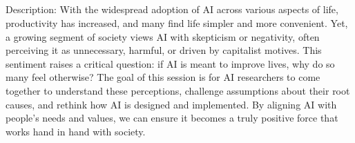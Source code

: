 \\  \vspace*{-0.1cm} \leavevmode\newline

 \\
\\
\\
Description: With the widespread adoption of AI across various aspects of life, productivity has increased, and many find life simpler and more convenient. Yet, a growing segment of society views AI with skepticism or negativity, often perceiving it as unnecessary, harmful, or driven by capitalist motives. This sentiment raises a critical question: if AI is meant to improve lives, why do so many feel otherwise? The goal of this session is for AI researchers to come together to understand these perceptions, challenge assumptions about their root causes, and rethink how AI is designed and implemented. By aligning AI with people's needs and values, we can ensure it becomes a truly positive force that works hand in hand with society.\\